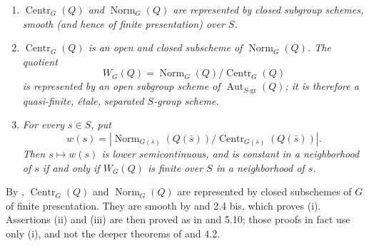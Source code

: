 \begin{enumerate}
\item[\textup{(i)}]
\textit{\(\operatorname{Centr}_G(Q)\) and
\(\operatorname{Norm}_G(Q)\) are represented by closed subgroup
schemes, smooth \textup{(and hence of finite presentation)} over
\(S\).}

\item[\textup{(ii)}]
\textit{\(\operatorname{Centr}_G(Q)\) is an open and closed
subscheme of \(\operatorname{Norm}_G(Q)\).  The quotient}
\[
  W_G(Q)
  =
  \operatorname{Norm}_G(Q)/\operatorname{Centr}_G(Q)
\]
\textit{is represented by an open subgroup scheme of
\(\operatorname{Aut}_{S\text{-}\mathrm{gr}}(Q)\); it is therefore a
quasi-finite, étale, separated \(S\)-group scheme.}

\item[\textup{(iii)}]
\textit{For every \(s\in S\), put}
\[
  w(s)
  =
  \left|
  \operatorname{Norm}_{G(\bar s)}(Q(\bar s))/
  \operatorname{Centr}_{G(\bar s)}(Q(\bar s))
  \right|.
\]
\textit{Then \(s\longmapsto w(s)\) is lower semicontinuous, and is
constant in a neighborhood of \(s\) if and only if \(W_G(Q)\) is
finite over \(S\) in a neighborhood of \(s\).}
\end{enumerate}

By ,
\(\operatorname{Centr}_G(Q)\) and \(\operatorname{Norm}_G(Q)\) are
represented by closed subschemes of \(G\) of finite presentation.
They are smooth by  and 2.4 bis, which proves
\textup{(i)}.  Assertions \textup{(ii)} and \textup{(iii)} are then
proved as in  and 5.10; those proofs in fact use only
\textup{(i)}, and not the deeper theorems of  and 4.2.
